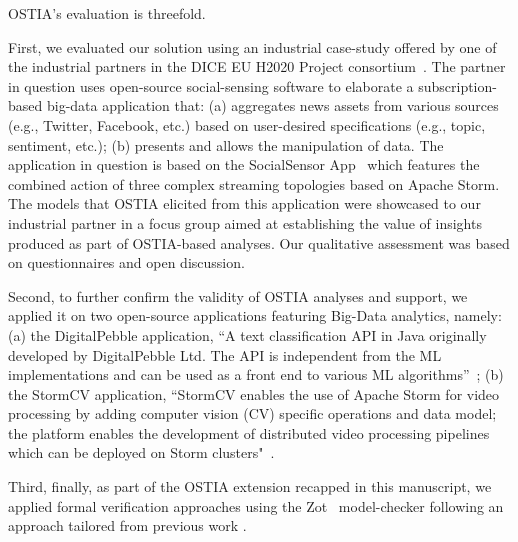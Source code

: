 \documentclass[smallextended]{svjour3}       %
\begin{document}
OSTIA's evaluation is threefold. 

First, we evaluated our solution using an industrial case-study offered by one of the industrial partners in the DICE EU H2020 Project consortium~\cite{dice2020}.
The
partner in question uses open-source social-sensing software to elaborate a
subscription-based big-data application that: (a) aggregates news assets from
various sources (e.g., Twitter, Facebook, etc.) based on user-desired
specifications (e.g., topic, sentiment, etc.); (b) presents and allows the
manipulation of data. The application in question is based on the SocialSensor
App~\cite{socialsensor}
%
which features the combined
action of three complex streaming topologies based on Apache Storm. The
models that OSTIA elicited from this application were showcased to our
industrial partner in a focus group aimed at establishing the value of insights
produced as part of OSTIA-based analyses. Our qualitative assessment was based
on questionnaires and open discussion.

Second, to further confirm the validity of OSTIA analyses and support, we
applied it on two open-source applications featuring Big-Data analytics, namely: (a) the DigitalPebble application,
``A text classification API in Java originally developed by DigitalPebble Ltd.
The API is independent from the ML implementations and can be used as a front
end to various ML algorithms''~\cite{storm-crawler}; (b) the StormCV application, 
``StormCV
enables the use of Apache Storm for video processing by adding computer vision
(CV) specific operations and data model; the platform enables the development of
distributed video processing pipelines which can be deployed on Storm clusters"~\cite{stormCV}.

Third, finally, as part of the OSTIA extension recapped in this manuscript, we applied formal verification approaches using the
Zot~\cite{zot}
model-checker following an approach tailored from previous work \cite{icsoft,BRS15}.
\end{document}
